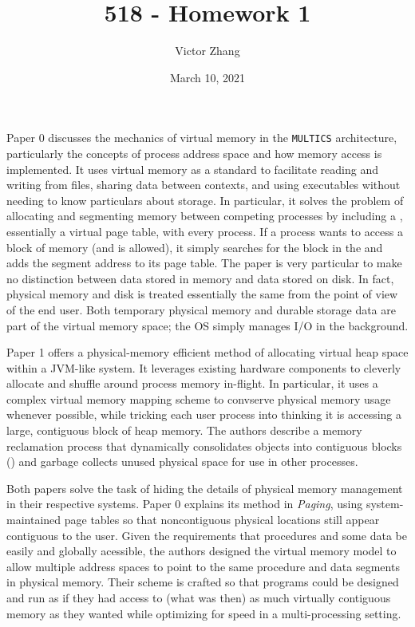 \documentclass{article}
\title{518 - Homework 1}
\author{Victor Zhang}
\date{March 10, 2021}
\begin{document}
\maketitle

Paper 0 discusses the mechanics of virtual memory in the \verb|MULTICS| architecture, particularly the concepts of process address space and how memory access is implemented. It uses virtual memory as a standard to facilitate reading and writing from files, sharing data between contexts, and using executables without needing to know particulars about storage. In particular, it solves the problem of allocating and segmenting memory between competing processes by including a , essentially a virtual page table, with every process. If a process wants to access a block of memory (and is allowed), it simply searches for the block in the  and adds the segment address to its page table. The paper is very particular to make no distinction between data stored in memory and data stored on disk. In fact, physical memory and disk is treated essentially the same from the point of view of the end user. Both temporary physical memory and durable storage data are part of the virtual memory space; the OS simply manages I/O in the background.

Paper 1 offers a physical-memory efficient method of allocating virtual heap space within a JVM-like system. It leverages existing hardware components to cleverly allocate and shuffle around process memory in-flight. In particular, it uses a complex virtual memory mapping scheme to convserve physical memory usage whenever possible, while tricking each user process into thinking it is accessing a large, contiguous block of heap memory. The authors describe a memory reclamation process that dynamically consolidates objects into contiguous blocks () and garbage collects unused physical space for use in other processes.

Both papers solve the task of hiding the details of physical memory management in their respective systems. Paper 0 explains its method in \textit{Paging}, using system-maintained page tables so that noncontiguous physical locations still appear contiguous to the user. Given the requirements that procedures and some data be easily and globally acessible, the authors designed the virtual memory model to allow multiple address spaces to point to the same procedure and data segments in physical memory. Their scheme is crafted so that programs could be designed and run as if they had access to (what was then) as much virtually contiguous memory as they wanted while optimizing for speed in a multi-processing setting.
\end{document}
